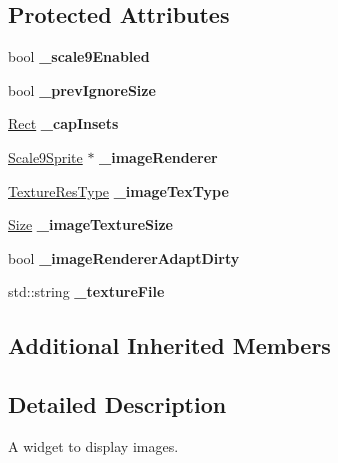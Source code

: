 \subsection*{Protected Attributes}
\begin{DoxyCompactItemize}
\item 
\mbox{\label{classui_1_1ImageView_ab50e2c3d15651880ebfbe5112d30e815}} 
bool {\bfseries \+\_\+scale9\+Enabled}
\item 
\mbox{\label{classui_1_1ImageView_a0076648f27faa96b10cb2456551faf5d}} 
bool {\bfseries \+\_\+prev\+Ignore\+Size}
\item 
\mbox{\label{classui_1_1ImageView_a7a9090148e391a20a56048d1ee618963}} 
\hyperlink{classRect}{Rect} {\bfseries \+\_\+cap\+Insets}
\item 
\mbox{\label{classui_1_1ImageView_a488c6e1f0503ce1105dc49d5efb5204b}} 
\hyperlink{classui_1_1Scale9Sprite}{Scale9\+Sprite} $\ast$ {\bfseries \+\_\+image\+Renderer}
\item 
\mbox{\label{classui_1_1ImageView_ab8769ce1ff9c4c9af73d4923977c4a60}} 
\hyperlink{classui_1_1Widget_a040a65ec5ad3b11119b7e16b98bd9af0}{Texture\+Res\+Type} {\bfseries \+\_\+image\+Tex\+Type}
\item 
\mbox{\label{classui_1_1ImageView_a75b690bc7e26dcb1b3f9dd9e73cf5a47}} 
\hyperlink{classSize}{Size} {\bfseries \+\_\+image\+Texture\+Size}
\item 
\mbox{\label{classui_1_1ImageView_ac91db01a69cde5a01de97233e16002c3}} 
bool {\bfseries \+\_\+image\+Renderer\+Adapt\+Dirty}
\item 
\mbox{\label{classui_1_1ImageView_ab4441d2f9f2de0f85eeede2223d44df2}} 
std\+::string {\bfseries \+\_\+texture\+File}
\end{DoxyCompactItemize}
\subsection*{Additional Inherited Members}


\subsection{Detailed Description}
A widget to display images. 

